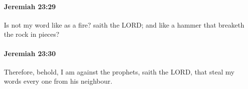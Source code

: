 		\paragraph{Jeremiah 23:29} %
			\label{JEREMIAH-23-29}

			Is not my word like as a fire? saith the LORD; and like a hammer that breaketh the rock in pieces?


		\paragraph{Jeremiah 23:30} %
			\label{JEREMIAH-23-30}

			Therefore, behold, I am against the prophets, saith the LORD, that steal my words every one from his neighbour.


